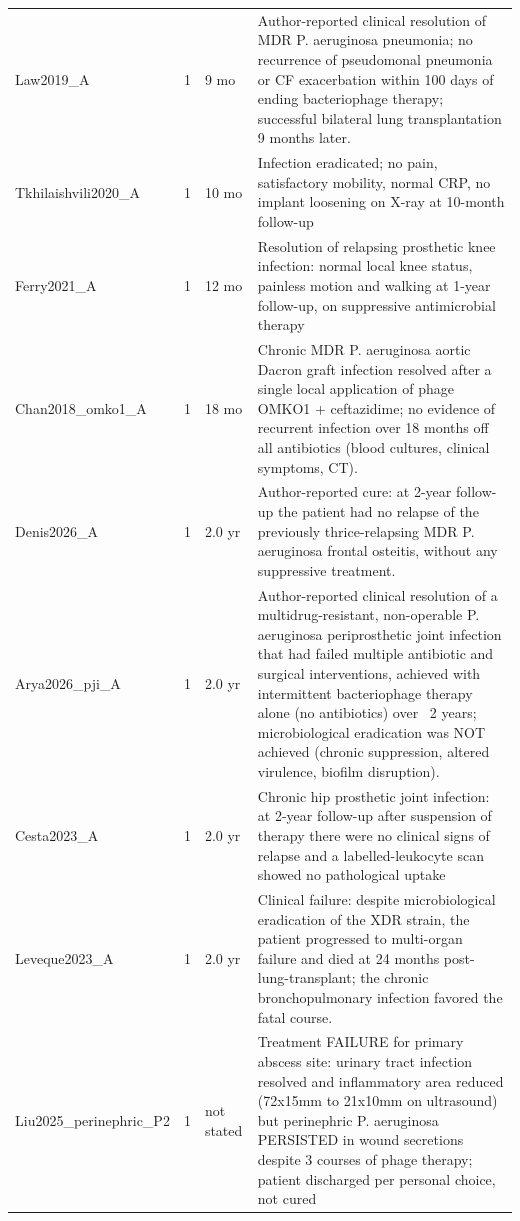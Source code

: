 \begin{tabular}{p{2.6cm}cp{1.5cm}p{8.4cm}}
Law2019\_A & 1 & 9 mo & Author-reported clinical resolution of MDR P. aeruginosa pneumonia; no recurrence of pseudomonal pneumonia or CF exacerbation within 100 days of ending bacteriophage therapy; successful bilateral lung transplantation 9 months later. \\
Tkhilaishvili2020\_A & 1 & 10 mo & Infection eradicated; no pain, satisfactory mobility, normal CRP, no implant loosening on X-ray at 10-month follow-up \\
Ferry2021\_A & 1 & 12 mo & Resolution of relapsing prosthetic knee infection: normal local knee status, painless motion and walking at 1-year follow-up, on suppressive antimicrobial therapy \\
Chan2018\_omko1\_A & 1 & 18 mo & Chronic MDR P. aeruginosa aortic Dacron graft infection resolved after a single local application of phage OMKO1 + ceftazidime; no evidence of recurrent infection over 18 months off all antibiotics (blood cultures, clinical symptoms, CT). \\
Denis2026\_A & 1 & 2.0 yr & Author-reported cure: at 2-year follow-up the patient had no relapse of the previously thrice-relapsing MDR P. aeruginosa frontal osteitis, without any suppressive treatment. \\
Arya2026\_pji\_A & 1 & 2.0 yr & Author-reported clinical resolution of a multidrug-resistant, non-operable P. aeruginosa periprosthetic joint infection that had failed multiple antibiotic and surgical interventions, achieved with intermittent bacteriophage therapy alone (no antibiotics) over ~2 years; microbiological eradication was NOT achieved (chronic suppression, altered virulence, biofilm disruption). \\
Cesta2023\_A & 1 & 2.0 yr & Chronic hip prosthetic joint infection: at 2-year follow-up after suspension of therapy there were no clinical signs of relapse and a labelled-leukocyte scan showed no pathological uptake \\
Leveque2023\_A & 1 & 2.0 yr & Clinical failure: despite microbiological eradication of the XDR strain, the patient progressed to multi-organ failure and died at 24 months post-lung-transplant; the chronic bronchopulmonary infection favored the fatal course. \\
Liu2025\_perinephric\_P2 & 1 & not stated & Treatment FAILURE for primary abscess site: urinary tract infection resolved and inflammatory area reduced (72x15mm to 21x10mm on ultrasound) but perinephric P. aeruginosa PERSISTED in wound secretions despite 3 courses of phage therapy; patient discharged per personal choice, not cured \\

\end{tabular}
